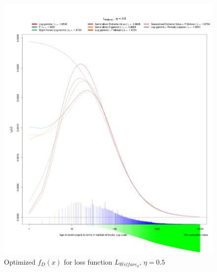 \documentclass[english]{article}
\begin{document}
\begin{figure}
\caption{Optimized $f_{D}(x)$ for loss function $L_{Welfare_{\eta}}$, $\eta=0.5$}

\includegraphics[scale=0.35]{images/dry-run/estimate/estimate-L_Welfare-flavor-0.5}
\end{figure}
\end{document}
